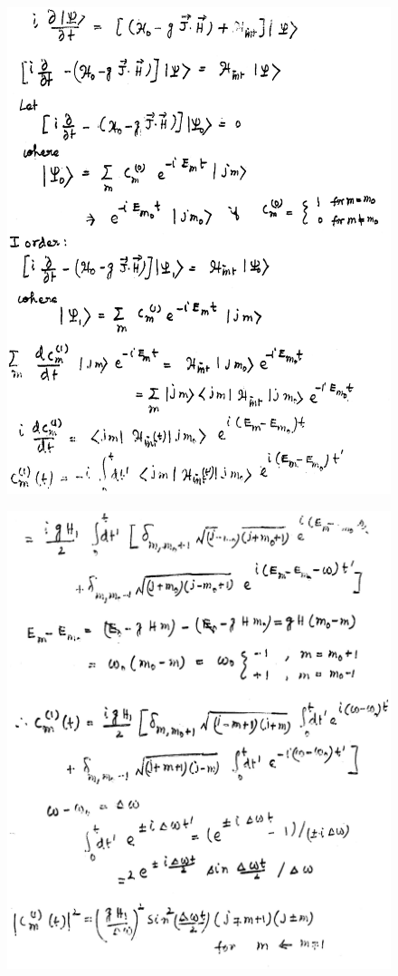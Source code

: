 \begin{figure}[H]
\centering
\includegraphics[scale=0.48]{src/images/chap8/4.eps}
\end{figure}
\begin{figure}[H]
\centering
\includegraphics[scale=0.48]{src/images/chap8/5.eps}
\end{figure}
